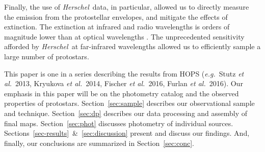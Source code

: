\documentclass[manuscript]{aastex61}
\newcommand{\etal}{{\em et al.}}
\newcommand{\eg}{{\em e.g.}}
\newcommand{\herschel}{{\em Herschel}}
\begin{document}
\par
Finally, the use of \herschel\ data, in particular, allowed us to directly measure the emission from the protostellar envelopes, and mitigate the effects of extinction.   The extinction at infrared and radio wavelengths is orders of magnitude lower than at optical wavelengths \citep{extinction}.  The unprecedented sensitivity afforded by \herschel\ at far-infrared wavelengths allowed us to efficiently sample a large number of protostars.
\par
This paper is one in a series describing the results from HOPS (\eg\ Stutz \etal\ 2013, Kryukova \etal\ 2014, Fischer \etal\ 2016, Furlan \etal\ 2016).  Our emphasis in this paper will be on the photometry catalog and the observed properties of protostars.  Section~\ref{sec:sample} describes our observational sample and technique.  Section~\ref{sec:dp} describes our data processing and assembly of final maps.  Section~\ref{sec:phot} discusses photometry of individual sources.  Sections~\ref{sec-results}~\&~\ref{sec:discussion} present and discuss our findings.  And, finally, our conclusions are summarized in Section~\ref{sec:conc}.
\end{document}
